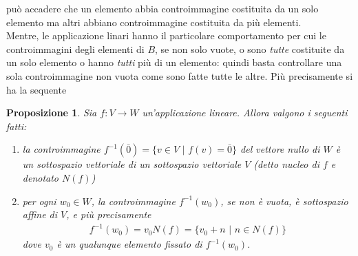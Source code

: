 \documentclass{book}
\theoremstyle{definition}
\theoremstyle{plain}
\newtheorem{prop}{Proposizione}[section]
\begin{document}
può accadere che un elemento abbia controimmagine costituita da un solo
elemento ma altri abbiano controimmagine costituita da più elementi.\\
Mentre, le applicazione linari hanno il particolare comportamento per cui
le controimmagini degli elementi di $B$, se non solo vuote, o sono
\textit{tutte} costituite da un solo elemento o hanno \textit{tutti} più
di un elemento: quindi basta controllare una sola controimmagine non vuota
come sono fatte tutte le altre. Più precisamente si ha la sequente
\begin{prop}
  \label{prop:iniediappllin1}
  Sia $f:V\to W$ un'applicazione lineare. Allora valgono i seguenti fatti:
  \begin{enumerate}
  \item la controimmagine $f^{-1}(\bar{0})=\{v\in V \text{ | }
    f(v)=\bar{0}\}$ del vettore nullo di $W$ è un sottospazio vettoriale
    di un sottospazio vettoriale $V$ (detto \textit{nucleo di} $f$ e
    denotato $N(f)$)
  \item per ogni $w_0\in W$, la controimmagine $f^{-1}(w_0)$, se non è
    vuota, è sottospazio affine di $V$, e più precisamente
    \begin{eqnarray*}
      f^{-1}(w_0)=v_0N(f)=\{v_0+n \text{ | } n\in N(f)\}
    \end{eqnarray*}
    dove $v_0$ è un qualunque elemento fissato di $f^{-1}(w_0)$.
  \end{enumerate}
\end{prop}
\end{document}
